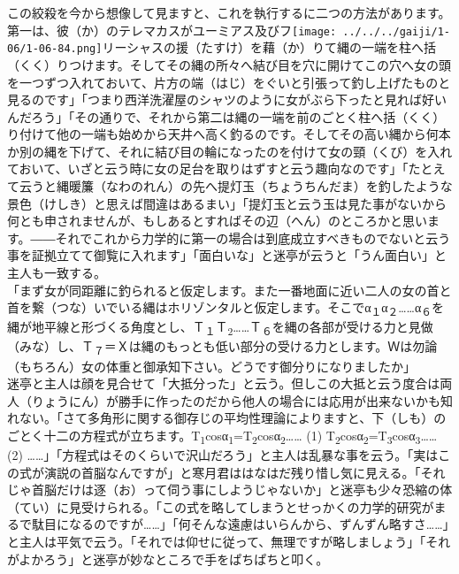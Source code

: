 \documentclass{book}
\begin{document}
この絞殺を今から想像して見ますと、これを執行するに二つの方法があります。第一は、彼（か）のテレマカスがユーミアス及びフ\texttt{[image: ../../../gaiji/1-06/1-06-84.png]}リーシャスの援（たすけ）を藉（か）りて縄の一端を柱へ括（くく）りつけます。そしてその縄の所々へ結び目を穴に開けてこの穴へ女の頭を一つずつ入れておいて、片方の端（はじ）をぐいと引張って釣し上げたものと見るのです」「つまり西洋洗濯屋のシャツのように女がぶら下ったと見れば好いんだろう」「その通りで、それから第二は縄の一端を前のごとく柱へ括（くく）り付けて他の一端も始めから天井へ高く釣るのです。そしてその高い縄から何本か別の縄を下げて、それに結び目の輪になったのを付けて女の頸（くび）を入れておいて、いざと云う時に女の足台を取りはずすと云う趣向なのです」「たとえて云うと縄暖簾（なわのれん）の先へ提灯玉（ちょうちんだま）を釣したような景色（けしき）と思えば間違はあるまい」「提灯玉と云う玉は見た事がないから何とも申されませんが、もしあるとすればその辺（へん）のところかと思います。――それでこれから力学的に第一の場合は到底成立すべきものでないと云う事を証拠立てて御覧に入れます」「面白いな」と迷亭が云うと「うん面白い」と主人も一致する。\\
「まず女が同距離に釣られると仮定します。また一番地面に近い二人の女の首と首を繋（つな）いでいる縄はホリゾンタルと仮定します。そこでα\textsubscript{１}α\textsubscript{２}\ldots{}\ldots{}α\textsubscript{６}を縄が地平線と形づくる角度とし、Ｔ\textsubscript{１}Ｔ\textsubscript{2}\ldots{}\ldots{}Ｔ\textsubscript{６}を縄の各部が受ける力と見做（みな）し、Ｔ\textsubscript{７}＝Ｘは縄のもっとも低い部分の受ける力とします。Ｗは勿論（もちろん）女の体重と御承知下さい。どうです御分りになりましたか」\\
迷亭と主人は顔を見合せて「大抵分った」と云う。但しこの大抵と云う度合は両人（りょうにん）が勝手に作ったのだから他人の場合には応用が出来ないかも知れない。「さて多角形に関する御存じの平均性理論によりますと、下（しも）のごとく十二の方程式が立ちます。T\textsubscript{1}cosα\textsubscript{1}=T\textsubscript{2}cosα\textsubscript{2}\ldots{}\ldots{}
(1)
T\textsubscript{2}cosα\textsubscript{2}=T\textsubscript{3}cosα\textsubscript{3}\ldots{}\ldots{}
(2)
\ldots{}\ldots{}」「方程式はそのくらいで沢山だろう」と主人は乱暴な事を云う。「実はこの式が演説の首脳なんですが」と寒月君ははなはだ残り惜し気に見える。「それじゃ首脳だけは逐（お）って伺う事にしようじゃないか」と迷亭も少々恐縮の体（てい）に見受けられる。「この式を略してしまうとせっかくの力学的研究がまるで駄目になるのですが\ldots{}\ldots{}」「何そんな遠慮はいらんから、ずんずん略すさ\ldots{}\ldots{}」と主人は平気で云う。「それでは仰せに従って、無理ですが略しましょう」「それがよかろう」と迷亭が妙なところで手をぱちぱちと叩く。\\
\end{document}

